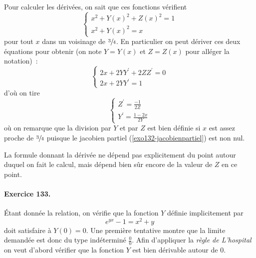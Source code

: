 Pour calculer les dérivées, on sait que ces fonctions vérifient
\begin{equation*}
\begin{cases}
x^2 + Y(x)^2 + Z(x)^2 = 1\\
x^2 + Y(x)^2 = x
\end{cases}
\end{equation*}
pour tout $x$ dans un voisinage de $\sfrac34$. En particulier on peut
dériver ces deux équations pour obtenir (on note $Y = Y(x)$ et $Z =
Z(x)$ pour alléger la notation)~:
\begin{equation*}
\begin{cases}
2 x + 2 Y Y^\prime + 2 Z Z^\prime = 0\\
2 x + 2 Y Y^\prime = 1
\end{cases}
\end{equation*}
d'où on tire
\begin{equation*}
\begin{cases}
Z^\prime = \frac {-1}{2Z}\\
Y^\prime = \frac{1 - 2 x}{2 Y}
\end{cases}
\end{equation*}
où on remarque que la division par $Y$ et par $Z$ est bien définie si
$x$ est assez proche de $\sfrac34$ puisque le jacobien partiel
(\ref{exo132-jacobienpartiel}) est non nul.

\begin{remark}
La formule donnant la dérivée ne dépend pas explicitement du point
autour duquel on fait le calcul, mais dépend bien sûr encore de la
valeur de $Z$ en ce point.
\end{remark}

\paragraph{Exercice 133.}
Étant donnée la relation, on vérifie que la fonction $Y$ définie
implicitement par
\begin{equation*}
e^{yx} - 1 = x^2 + y
\end{equation*}
doit satisfaire à $Y(0) = 0$. Une première tentative montre que la
limite demandée est donc du type indéterminé \og $\frac00$\fg{}. Afin
d'appliquer la \emph{règle de L'hospital} on veut d'abord vérifier que
la fonction $Y$ est bien dérivable autour de $0$.


